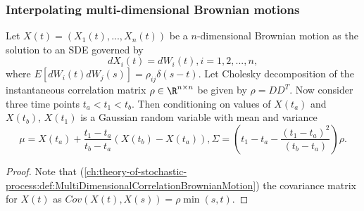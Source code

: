 \begin{refsection}
\subsubsection{Interpolating multi-dimensional Brownian motions}


\begin{lemma}
	Let $X(t) = (X_1(t),...,X_n(t))$ be a $n$-dimensional Brownian motion as the solution to an SDE governed by
	$$dX_i(t) = dW_i(t),i=1,2,...,n,$$
	where $E[dW_i(t)dW_j(s)] = \rho_{ij}\delta(s-t)$. 
 Let Cholesky decomposition of the instantaneous correlation matrix $\rho\in \R^{n\times n}$ be given by $\rho = DD^{T}$. Now consider three time points $t_a<t_1<t_b$. Then conditioning on values of $X(t_a)$ and $X(t_b)$,
	$X(t_1)$ is a Gaussian random variable with mean and variance $$\mu = X(t_a) + \frac{t_1-t_a}{t_b-t_a}(X(t_b)-X(t_a)), \Sigma = (t_1-t_a - \frac{(t_1-t_a)^2}{(t_b-t_a)})\rho.$$
\end{lemma}
\begin{proof}
Note that (\autoref{ch:theory-of-stochastic-process:def:MultiDimensionalCorrelationBrownianMotion}) the covariance matrix for $X(t)$ as $Cov(X(t),X(s)) =  \rho \min(s,t)$. 	
	

\end{proof}
\end{refsection}

